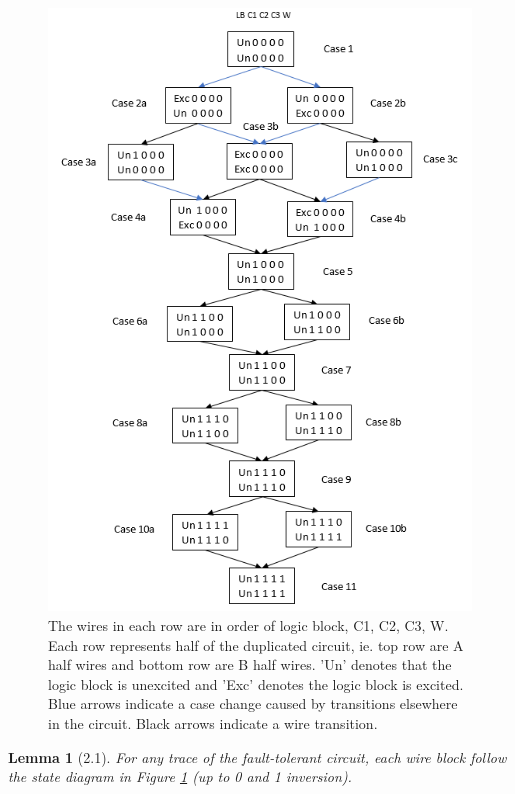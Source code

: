 \documentclass[12pt]{report}
\newtheorem*{lemma}{Lemma}
\begin{document}
\begin{figure}
  \centering
    \includegraphics{flowl2c3}
  \caption{The wires in each row are in order of logic block, C1, C2, C3, W.  Each row represents half of the duplicated circuit, ie. top row are A half wires and bottom row are B half wires.  'Un' denotes that the logic block is unexcited and 'Exc' denotes the logic block is excited.  Blue arrows indicate a case change caused by transitions elsewhere in the circuit.  Black arrows indicate a wire transition.}
  \label{fig:l21}
\end{figure}
\begin{lemma}[2.1]
For any trace of the fault-tolerant circuit, each wire block follow the state diagram in Figure \ref{fig:l21} (up to 0 and 1 inversion).
\end{lemma}
\end{document}
